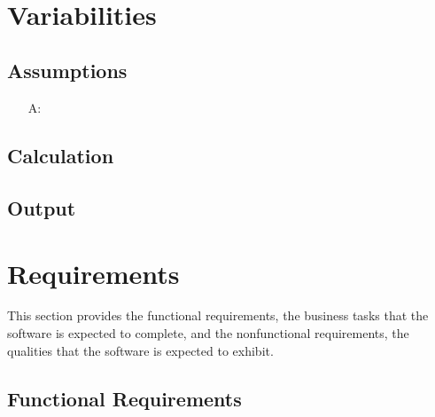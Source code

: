 \documentclass[12pt]{article}
\newcounter{assumpnum} %
\begin{document}
~\newline

\section{Variabilities}

\subsection{Assumptions}

\begin{itemize}

\item[A\refstepcounter{assumpnum}\theassumpnum \label{A_meaningfulLabel}:]

\end{itemize}

\subsection{Calculation} \label{sec_Calculation}

\subsection{Output} \label{sec_Output}    

\section{Requirements}

This section provides the functional requirements, the business tasks that the
software is expected to complete, and the nonfunctional requirements, the
qualities that the software is expected to exhibit.

\subsection{Functional Requirements}
\end{document}
